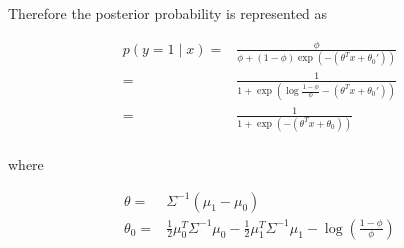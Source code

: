 \begin{answer}
Therefore the posterior probability is represented as

\begin{align*}
    p(y=1\mid x) =& \frac{\phi}{\phi + (1 - \phi)\exp(-(\theta^T x + \theta_{0}'))} \\
    =& \frac{1}{1 + \exp(\log{\frac{1 - \phi}{\phi}}-(\theta^T x + \theta_{0}'))} \\
    =& \frac{1}{1 + \exp(-(\theta^T x + \theta_{0}))} \\
\end{align*}

where

\begin{align*}
    \theta =& \Sigma^{-1} (\mu_{1} - \mu_{0}) \\
    \theta_{0} =& \frac{1}{2}\mu_{0}^T\Sigma^{-1}\mu_{0} - \frac{1}{2}\mu_{1}^T\Sigma^{-1}\mu_{1} - \log{\left(\frac{1-\phi}{\phi}\right)}
\end{align*}

\end{answer}
